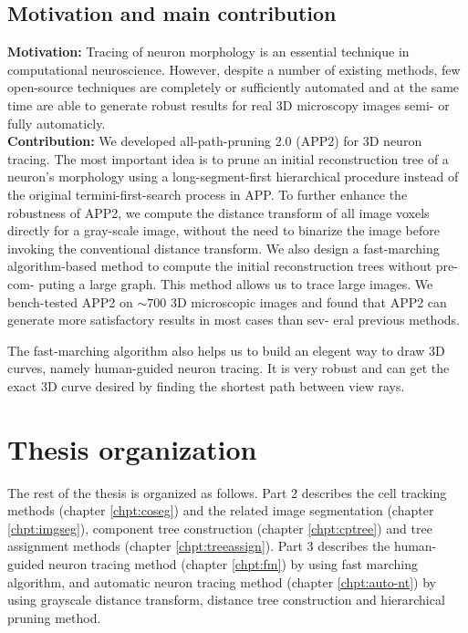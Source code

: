 \subsection{Motivation and main contribution}\label{sec:contrib}
\textbf{Motivation:} Tracing of neuron morphology is an essential technique in computational neuroscience. However, despite a number of existing methods, few open-source techniques are completely or sufficiently automated and at the same time are able to generate robust results for real 3D microscopy images semi- or fully automaticly. 
\\
\textbf{Contribution:} We developed all-path-pruning 2.0 (APP2) for 3D neuron tracing. The most important idea is to prune an initial reconstruction tree of a neuron’s morphology using a long-segment-first hierarchical procedure instead of the original termini-first-search process in APP. To further enhance the robustness of APP2, we compute the distance transform of all image voxels directly for a gray-scale image, without the need to binarize the image before invoking the conventional distance transform. We also design a fast-marching algorithm-based method to compute the initial reconstruction trees without pre-com- puting a large graph. This method allows us to trace large images. We bench-tested APP2 on $\sim 700$ 3D microscopic images and found that APP2 can generate more satisfactory results in most cases than sev- eral previous methods. 

The fast-marching algorithm also helps us to build an elegent way to draw 3D curves, namely human-guided neuron tracing. It is very robust and can get the exact 3D curve desired by finding the shortest path between view rays. 

\section{Thesis organization}
The rest of the thesis is organized as follows. Part 2 describes the cell tracking methods (chapter \ref{chpt:coseg}) and the related image segmentation (chapter \ref{chpt:imgseg}), component tree construction (chapter \ref{chpt:cptree}) and tree assignment methods (chapter \ref{chpt:treeassign}). Part 3 describes the human-guided neuron tracing method (chapter \ref{chpt:fm}) by using fast marching algorithm, and automatic neuron tracing method (chapter \ref{chpt:auto-nt}) by using grayscale distance transform, distance tree construction and hierarchical pruning method.

